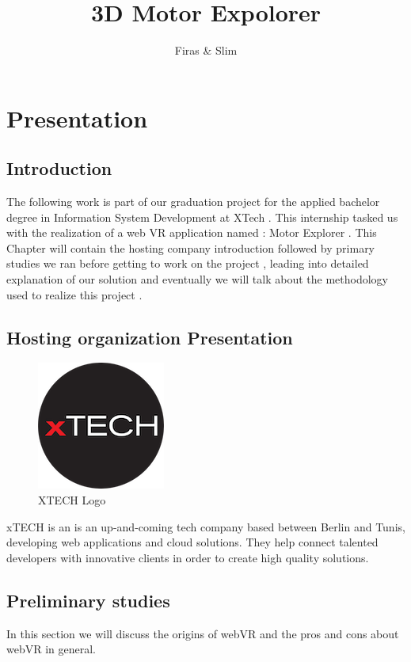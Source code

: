 \documentclass[]{report}
\title{3D Motor Expolorer}
\author{Firas \& Slim}
\begin{document}
\maketitle
\tableofcontents
\listoffigures
\listoftables

\newpage
\chapter{Presentation}
\section{Introduction}
 The following work is part of our graduation project for the applied bachelor
	degree in Information System Development at XTech . This internship tasked us
	with the realization of a web VR application named : Motor Explorer .
	This Chapter will contain the hosting company introduction followed by
	primary studies we ran before getting to work on the project , leading into
	detailed explanation of our solution and eventually we will talk about the
	methodology used to realize this project .

\section{Hosting organization Presentation}
\begin{figure}[H]
	\begin{center}
	\includegraphics[scale=1]{XTECHLogo.png}
	\caption{XTECH Logo}
	\end{center}
\end{figure} \par



xTECH is an is an up-and-coming tech company based between Berlin and Tunis, developing web applications and cloud solutions. They help connect talented developers with innovative clients in order to create high quality solutions.\par


\section{Preliminary studies}
In this section we will discuss the origins of webVR and the pros and cons
about webVR in general.
\end{document}
